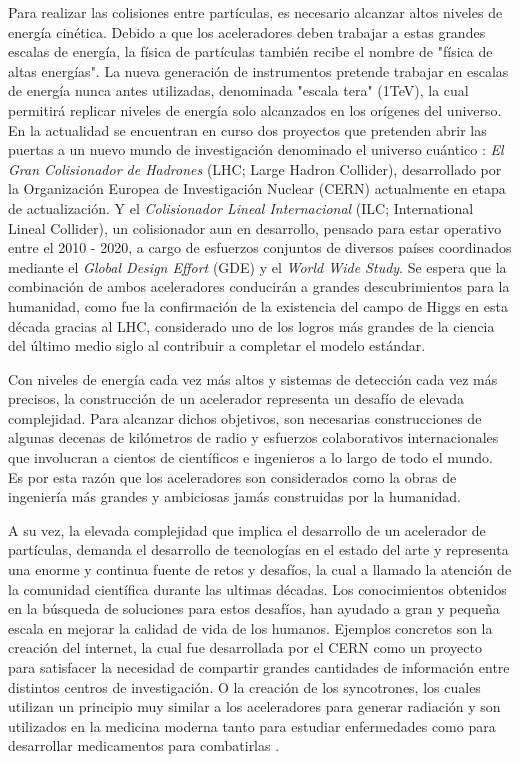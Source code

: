 	Para realizar las colisiones entre partículas, es necesario alcanzar altos niveles de energía cinética. Debido a que los aceleradores deben trabajar a estas grandes escalas de energía, la física de partículas también recibe el nombre de "física de altas energías".  La nueva generación de instrumentos pretende trabajar en escalas de energía nunca antes utilizadas, denominada "escala tera" (1TeV), la cual permitirá replicar niveles de energía solo alcanzados en los orígenes del universo. En la actualidad se encuentran en curso dos proyectos que pretenden abrir las puertas a un nuevo mundo de investigación denominado el universo cuántico \citep{ilc101}: \textit{El Gran Colisionador de Hadrones} (LHC; Large Hadron Collider), desarrollado por la Organización Europea de Investigación Nuclear (CERN) actualmente en etapa de actualización. Y el \textit{Colisionador Lineal Internacional} (ILC; International Lineal Collider), un colisionador aun en desarrollo, pensado para estar operativo entre el 2010 - 2020, a cargo de esfuerzos conjuntos de diversos países coordinados mediante el \textit{Global Design Effort} (GDE) y el \textit{World Wide Study}.
 Se espera que la combinación de ambos aceleradores conducirán a grandes descubrimientos para la humanidad, como fue la confirmación de la existencia del campo de Higgs en esta década gracias al LHC, considerado uno de los logros más grandes de la ciencia del último medio siglo al contribuir a completar el modelo estándar.

	Con niveles de energía cada vez más altos y sistemas de detección cada vez más precisos, la construcción de un acelerador representa un desafío de elevada complejidad. Para alcanzar dichos objetivos, son necesarias construcciones de algunas decenas de kilómetros de radio y esfuerzos colaborativos internacionales que involucran a cientos de científicos e ingenieros a lo largo de todo el mundo. Es por esta razón que los aceleradores son considerados como la obras de ingeniería más grandes y ambiciosas jamás construidas por la humanidad.

	A su vez, la elevada complejidad que implica el desarrollo de un acelerador de partículas,  demanda el desarrollo de tecnologías en el estado del arte y representa una enorme y continua fuente de retos y desafíos, la cual a llamado la atención de la comunidad científica durante las ultimas décadas.  Los conocimientos obtenidos en la búsqueda de soluciones para estos desafíos, han ayudado a gran y pequeña escala en mejorar la calidad de vida de los humanos. Ejemplos concretos son la creación del internet, la cual fue desarrollada por el CERN como un proyecto para satisfacer la necesidad de compartir grandes cantidades de información entre distintos centros de investigación. O la creación de los syncotrones, los cuales utilizan un principio muy similar a los aceleradores para generar radiación y son utilizados en la medicina moderna tanto para estudiar enfermedades como para desarrollar medicamentos para combatirlas \citep{tuttle101}.

